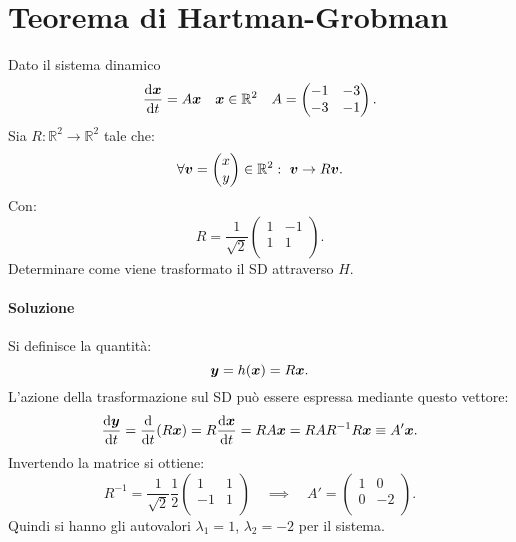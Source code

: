 \section{Teorema di Hartman-Grobman}%
\begin{ex}
    Dato il sistema dinamico 
     \[
        \frac{\text{d} \boldsymbol{x}}{\text{d} t} = A \boldsymbol{x} \quad  \boldsymbol{x}\in \mathbb{R}^2 \quad  A = 
    \begin{pmatrix}
	-1 & -3 \\
	-3 & -1 \\
    \end{pmatrix}
    .\] 
    Sia $R:\mathbb{R}^2\to \mathbb{R}^2 $  tale che:
    \[
        \forall \boldsymbol{v} = \begin{pmatrix} x \\ y \end{pmatrix} \in \mathbb{R}^2: \ \boldsymbol{v}\to R\boldsymbol{v}
    .\] 
    Con:
    \[
        R = \frac{1}{\sqrt{2} } 
    \begin{pmatrix}
	1 & -1 \\
	1 & 1 \\
    \end{pmatrix}
    .\]  
    Determinare come viene trasformato il SD attraverso $H$.
\end{ex}
\paragraph{Soluzione}%
Si definisce la quantità:
\[
    \boldsymbol{y} = h(\boldsymbol{x}) = R \boldsymbol{x}
.\] 
L'azione della trasformazione sul SD può essere espressa mediante questo vettore:
\[
    \frac{\text{d} \boldsymbol{y}}{\text{d} t} = \frac{\text{d} }{\text{d} t} (R \boldsymbol{x}) = R\frac{\text{d} \boldsymbol{x}}{\text{d} t} =
    R A \boldsymbol{x} = R A R^{-1} R \boldsymbol{x} \equiv A' \boldsymbol{x}
.\] 
Invertendo la matrice si ottiene: 
\[
    R^{-1} = \frac{1}{\sqrt{2}}\frac{1}{2} 
    \begin{pmatrix}
        1  & 1 \\
       -1  & 1 \\
    \end{pmatrix}
    \quad\implies\quad 
    A' = 
    \begin{pmatrix}
        1 & 0 \\
        0 & -2 \\
    \end{pmatrix}
.\] 
Quindi si hanno gli autovalori $\lambda_1 = 1$, $\lambda_2 = -2$ per il sistema.

